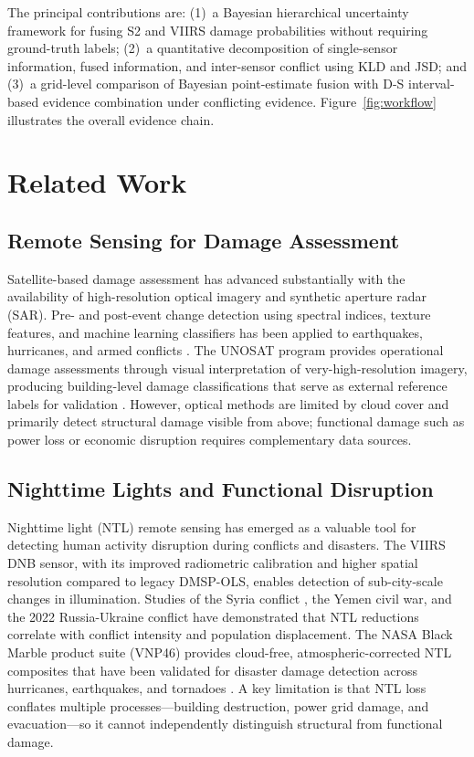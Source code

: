 \documentclass[wcp]{jmlr}
\begin{document}
The principal contributions are: (1)~a Bayesian hierarchical uncertainty
framework for fusing S2 and VIIRS damage probabilities without requiring
ground-truth labels; (2)~a quantitative decomposition of single-sensor
information, fused information, and inter-sensor conflict using KLD and
JSD; and (3)~a grid-level comparison of Bayesian point-estimate fusion with
D-S interval-based evidence combination under conflicting evidence.
Figure~\ref{fig:workflow} illustrates the overall evidence chain.

\section{Related Work}\label{sec:related}

\subsection{Remote Sensing for Damage Assessment}

Satellite-based damage assessment has advanced substantially with the
availability of high-resolution optical imagery and synthetic aperture
radar (SAR). Pre- and post-event change detection using spectral indices,
texture features, and machine learning classifiers has been applied to
earthquakes, hurricanes, and armed conflicts \cite{lebedev2022}. The
UNOSAT program provides operational damage assessments through visual
interpretation of very-high-resolution imagery, producing building-level
damage classifications that serve as external reference labels for
validation \cite{unosat2022}. However, optical methods are limited by cloud
cover and primarily detect structural damage visible from above; functional
damage such as power loss or economic disruption requires complementary
data sources.

\subsection{Nighttime Lights and Functional Disruption}

Nighttime light (NTL) remote sensing has emerged as a valuable tool for
detecting human activity disruption during conflicts and disasters. The
VIIRS DNB sensor, with its improved radiometric calibration and higher
spatial resolution compared to legacy DMSP-OLS, enables detection of
sub-city-scale changes in illumination. Studies of the Syria conflict
\cite{li2018}, the Yemen civil war, and the 2022 Russia-Ukraine conflict
\cite{xiao2024} have demonstrated that NTL reductions correlate with
conflict intensity and population displacement. The NASA Black Marble
product suite (VNP46) provides cloud-free, atmospheric-corrected NTL
composites that have been validated for disaster damage detection across
hurricanes, earthquakes, and tornadoes \cite{zhang2023}. A key limitation
is that NTL loss conflates multiple processes---building destruction, power
grid damage, and evacuation---so it cannot independently distinguish
structural from functional damage.
\end{document}
